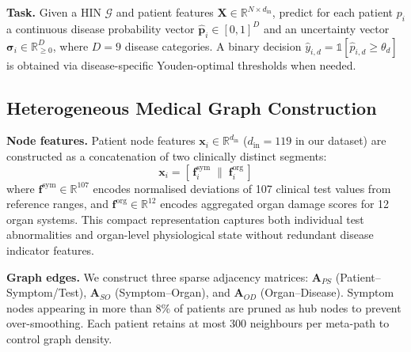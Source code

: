 \documentclass[conference]{IEEEtran}
\begin{document}
\textbf{Task.}
Given a HIN $\mathcal{G}$ and patient features
$\mathbf{X} \in \mathbb{R}^{N \times d_{\text{in}}}$,
predict for each patient $p_i$ a continuous disease probability vector
$\hat{\mathbf{p}}_i \in [0,1]^D$ and an uncertainty vector
$\boldsymbol{\sigma}_i \in \mathbb{R}_{\geq 0}^D$,
where $D = 9$ disease categories.
A binary decision $\hat{y}_{i,d} = \mathbb{1}[\hat{p}_{i,d} \geq \theta_d]$
is obtained via disease-specific Youden-optimal thresholds when needed.

\subsection{Heterogeneous Medical Graph Construction}
\label{subsec:graph}

\textbf{Node features.}
Patient node features $\mathbf{x}_i \in \mathbb{R}^{d_{\text{in}}}$
($d_{\text{in}} = 119$ in our dataset) are constructed
as a concatenation of two clinically distinct segments:
\begin{equation}
  \mathbf{x}_i = [\,\mathbf{f}_i^{\text{sym}} \;\|\;
                   \mathbf{f}_i^{\text{org}}\,]
\end{equation}
where $\mathbf{f}^{\text{sym}} \in \mathbb{R}^{107}$ encodes normalised
deviations of 107 clinical test values from reference ranges,
and $\mathbf{f}^{\text{org}} \in \mathbb{R}^{12}$ encodes aggregated organ
damage scores for 12 organ systems.
This compact representation captures both individual test abnormalities and
organ-level physiological state without redundant disease indicator features.

\textbf{Graph edges.}
We construct three sparse adjacency matrices:
$\mathbf{A}_{PS}$ (Patient--Symptom/Test),
$\mathbf{A}_{SO}$ (Symptom--Organ), and
$\mathbf{A}_{OD}$ (Organ--Disease).
Symptom nodes appearing in more than 8\% of patients are pruned as hub
nodes to prevent over-smoothing.
Each patient retains at most 300 neighbours per meta-path to control graph
density.
\end{document}
